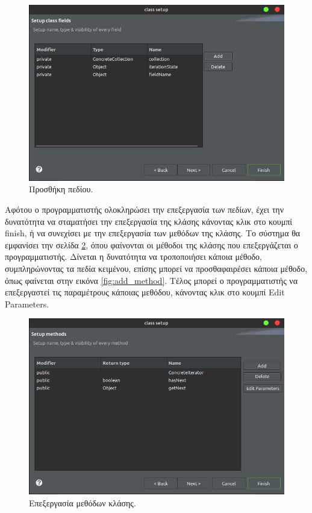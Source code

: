 \begin{figure}[H]
    \centering
    \includegraphics[width=1.0\textwidth]{Figures/add_field.png}
    \caption{Προσθήκη πεδίου.}
    \label{fig:add_field}
\end{figure}
Αφότου ο προγραμματιστής ολοκληρώσει την επεξεργασία των πεδίων, 
έχει την δυνατότητα να σταματήσει την επεξεργασία της κλάσης κάνοντας κλικ στο κουμπί finish, 
ή να συνεχίσει με την επεξεργασία των μεθόδων της κλάσης. Το σύστημα θα εμφανίσει την σελίδα \ref{fig:edit_class_methods}, 
όπου φαίνονται οι μέθοδοι της κλάσης που επεξεργάζεται ο προγραμματιστής. Δίνεται η δυνατότητα να τροποποιήσει κάποια μέθοδο, 
συμπληρώνοντας τα πεδία κειμένου, επίσης μπορεί να προσθαφαιρέσει κάποια μέθοδο, όπως φαίνεται στην εικόνα \ref{fig:add_method}.
Τέλος μπορεί ο προγραμματιστής να επεξεργαστεί τις παραμέτρους κάποιας μεθόδου, κάνοντας κλικ στο κουμπί Edit Parameters.
\begin{figure}[H]
    \centering
    \includegraphics[width=1.0\textwidth]{Figures/edit_class_methods.png}
    \caption{Επεξεργασία μεθόδων κλάσης.}
    \label{fig:edit_class_methods}
\end{figure}

